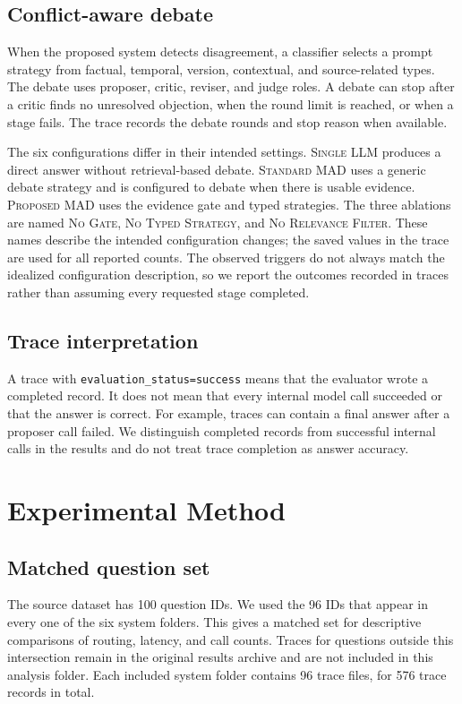 \documentclass[conference]{IEEEtran}
\begin{document}
\subsection{Conflict-aware debate}
When the proposed system detects disagreement, a classifier selects a prompt strategy from factual, temporal, version, contextual, and source-related types. The debate uses proposer, critic, reviser, and judge roles. A debate can stop after a critic finds no unresolved objection, when the round limit is reached, or when a stage fails. The trace records the debate rounds and stop reason when available.

The six configurations differ in their intended settings. \textsc{Single LLM} produces a direct answer without retrieval-based debate. \textsc{Standard MAD} uses a generic debate strategy and is configured to debate when there is usable evidence. \textsc{Proposed MAD} uses the evidence gate and typed strategies. The three ablations are named \textsc{No Gate}, \textsc{No Typed Strategy}, and \textsc{No Relevance Filter}. These names describe the intended configuration changes; the saved values in the trace are used for all reported counts. The observed triggers do not always match the idealized configuration description, so we report the outcomes recorded in traces rather than assuming every requested stage completed.

\subsection{Trace interpretation}
A trace with \texttt{evaluation\_status=success} means that the evaluator wrote a completed record. It does not mean that every internal model call succeeded or that the answer is correct. For example, traces can contain a final answer after a proposer call failed. We distinguish completed records from successful internal calls in the results and do not treat trace completion as answer accuracy.

\section{Experimental Method}
\subsection{Matched question set}
The source dataset has 100 question IDs. We used the 96 IDs that appear in every one of the six system folders. This gives a matched set for descriptive comparisons of routing, latency, and call counts. Traces for questions outside this intersection remain in the original results archive and are not included in this analysis folder. Each included system folder contains 96 trace files, for 576 trace records in total.
\end{document}
